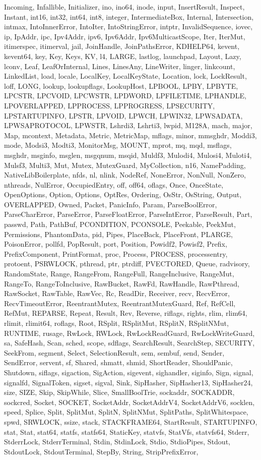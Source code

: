 {Incoming, Infallible, Initializer, ino, ino64, inode, input, InsertResult, Inspect, Instant, int16, int32, int64, int8, integer, IntermediateBox, Internal, Intersection, intmax, IntoInnerError, IntoIter, IntoStringError, intptr, InvalidSequence, iovec, ip, IpAddr, ipc, Ipv4Addr, ipv6, Ipv6Addr, Ipv6MulticastScope, Iter, IterMut, itimerspec, itimerval, jail, JoinHandle, JoinPathsError, KDHELP64, kevent, kevent64, key, Key, Keys, KV, l4, LARGE, lastlog, launchpad, Layout, Lazy, lconv, Leaf, LeafOrInternal, Lines, LinesAny, LineWriter, linger, linkcount, LinkedList, load, locale, LocalKey, LocalKeyState, Location, lock, LockResult, loff, LONG, lookup, lookupflags, LookupHost, LPBOOL, LPBY, LPBYTE, LPCSTR, LPCVOID, LPCWSTR, LPDWORD, LPFILETIME, LPHANDLE, LPOVERLAPPED, LPPROCESS, LPPROGRESS, LPSECURITY, LPSTARTUPINFO, LPSTR, LPVOID, LPWCH, LPWIN32, LPWSADATA, LPWSAPROTOCOL, LPWSTR, Lshrdi3, Lshrti3, lwpid, M128A, mach, major, Map, mcontext, Metadata, Metric, MetricMap, mflags, minor, mmsghdr, Moddi3, mode, Modsi3, Modti3, MonitorMsg, MOUNT, mprot, mq, mqd, msflags, msghdr, msginfo, msglen, msgqnum, msqid, Muldf3, Mulodi4, Mulosi4, Muloti4, Mulsf3, Multi3, Mut, Mutex, MutexGuard, MyCollection, n16, NamePadding, NativeLibBoilerplate, nfds, nl, nlink, NodeRef, NoneError, NonNull, NonZero, nthreads, NulError, OccupiedEntry, off, off64, oflags, Once, OnceState, OpenOptions, Option, Options, OptRes, Ordering, OsStr, OsString, Output, OVERLAPPED, Owned, Packet, PanicInfo, Param, ParseBoolError, ParseCharError, ParseError, ParseFloatError, ParseIntError, ParseResult, Part, passwd, Path, PathBuf, PCONDITION, PCONSOLE, Peekable, PeekMut, Permissions, PhantomData, pid, Pipes, PlaceBack, PlaceFront, PLARGE, PoisonError, pollfd, PopResult, port, Position, Powidf2, Powisf2, Prefix, PrefixComponent, PrintFormat, proc, Process, PROCESS, processentry, protoent, PSRWLOCK, pthread, ptr, ptrdiff, PVECTORED, Queue, radvisory, RandomState, Range, RangeFrom, RangeFull, RangeInclusive, RangeMut, RangeTo, RangeToInclusive, RawBucket, RawFd, RawHandle, RawPthread, RawSocket, RawTable, RawVec, Rc, ReadDir, Receiver, recv, RecvError, RecvTimeoutError, ReentrantMutex, ReentrantMutexGuard, Ref, RefCell, RefMut, REPARSE, Repeat, Result, Rev, Reverse, riflags, rights, rlim, rlim64, rlimit, rlimit64, roflags, Root, RSplit, RSplitMut, RSplitN, RSplitNMut, RUNTIME, rusage, RwLock, RWLock, RwLockReadGuard, RwLockWriteGuard, sa, SafeHash, Scan, sched, scope, sdflags, SearchResult, SearchStep, SECURITY, SeekFrom, segment, Select, SelectionResult, sem, sembuf, send, Sender, SendError, servent, sf, Shared, shmatt, shmid, ShortReader, ShouldPanic, Shutdown, siflags, sigaction, SigAction, sigevent, sighandler, siginfo, Sign, signal, signalfd, SignalToken, sigset, sigval, Sink, SipHasher, SipHasher13, SipHasher24, size, SIZE, Skip, SkipWhile, Slice, SmallBoolTrie, sockaddr, SOCKADDR, sockcred, Socket, SOCKET, SocketAddr, SocketAddrV4, SocketAddrV6, socklen, speed, Splice, Split, SplitMut, SplitN, SplitNMut, SplitPaths, SplitWhitespace, spwd, SRWLOCK, ssize, stack, STACKFRAME64, StartResult, STARTUPINFO, stat, Stat, stat64, statfs, statfs64, StaticKey, statvfs, StatVfs, statvfs64, Stderr, StderrLock, StderrTerminal, Stdin, StdinLock, Stdio, StdioPipes, Stdout, StdoutLock, StdoutTerminal, StepBy, String, StripPrefixError, }
